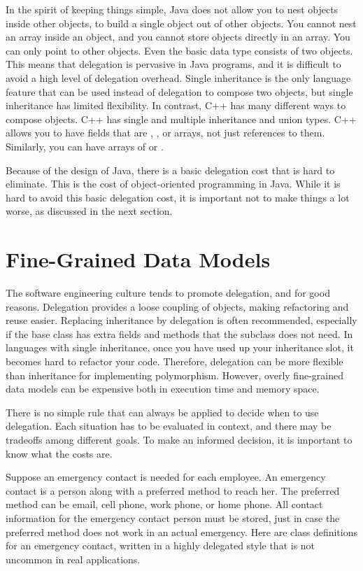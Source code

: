 In the spirit of keeping things simple, Java does not allow you to nest objects
inside other objects, to build a single object out of other objects. You cannot
nest an array inside an object, and you cannot store objects directly in an
array.  You can only point to other objects. Even the basic data type
 consists of two objects. This means that delegation is pervasive
in Java programs, and it is difficult to avoid a high level of delegation
overhead. Single inheritance is the only language feature that can be used
instead of delegation to compose two objects, but single inheritance has limited
flexibility.  In contrast, C++ has many different ways to compose objects. C++
has single and multiple inheritance and union types. C++ allows you
to have fields that are , , or arrays, not just
references to them.  Similarly, you can have arrays of  or
.

Because of the design of Java, there is a basic delegation cost that is hard to eliminate.
This is the cost of object-oriented programming in Java. While it is hard to avoid this basic
delegation cost, it is important not to make things a lot worse, as discussed in the next section. 

\section{Fine-Grained Data Models}
\label{fine-grained-data-models}

The software engineering culture tends to promote delegation, and for good reasons. 
Delegation provides a loose coupling of objects, making refactoring and reuse easier. 
Replacing inheritance by delegation is often recommended, especially if the base class
has extra fields and methods that the subclass does not need. In languages with single inheritance,
once you have used up your inheritance slot, it becomes hard to refactor your code. Therefore,
delegation can be more flexible than inheritance for implementing polymorphism. However, overly fine-grained
data models can be expensive both in execution time and memory space. 

There is no simple rule that can always be applied to decide when to use delegation. Each situation has to be evaluated
in context, and there may be tradeoffs among different goals. To make an informed decision, it is important to know what
the costs are.

Suppose an emergency contact is needed for each employee. An emergency contact is a person along with a preferred method
to reach her.  The preferred method can be email, cell phone, work phone, or home phone. All contact information for
the emergency contact person must be stored, just in case the preferred method does not work in an actual emergency. 
Here are class definitions for an emergency contact, written in a highly delegated style that is not uncommon in real applications. 

